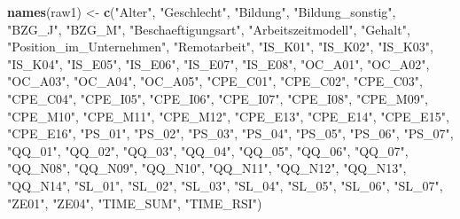 \documentclass[
]{article}
\newenvironment{Shaded}{\begin{snugshade}}{\end{snugshade}}
\newcommand{\FunctionTok}[1]{\textcolor[rgb]{0.13,0.29,0.53}{\textbf{#1}}}
\newcommand{\NormalTok}[1]{#1}
\newcommand{\OtherTok}[1]{\textcolor[rgb]{0.56,0.35,0.01}{#1}}
\newcommand{\StringTok}[1]{\textcolor[rgb]{0.31,0.60,0.02}{#1}}
\begin{document}
\begin{Shaded}
\begin{Highlighting}[]
\FunctionTok{names}\NormalTok{(raw1) }\OtherTok{\textless{}{-}} \FunctionTok{c}\NormalTok{(}\StringTok{"Alter"}\NormalTok{, }\StringTok{"Geschlecht"}\NormalTok{, }\StringTok{"Bildung"}\NormalTok{, }\StringTok{"Bildung\_sonstig"}\NormalTok{, }\StringTok{"BZG\_J"}\NormalTok{, }\StringTok{"BZG\_M"}\NormalTok{, }\StringTok{"Beschaeftigungsart"}\NormalTok{, }\StringTok{"Arbeitszeitmodell"}\NormalTok{, }\StringTok{"Gehalt"}\NormalTok{, }\StringTok{"Position\_im\_Unternehmen"}\NormalTok{, }\StringTok{"Remotarbeit"}\NormalTok{, }\StringTok{"IS\_K01"}\NormalTok{, }\StringTok{"IS\_K02"}\NormalTok{, }\StringTok{"IS\_K03"}\NormalTok{, }\StringTok{"IS\_K04"}\NormalTok{, }\StringTok{"IS\_E05"}\NormalTok{, }\StringTok{"IS\_E06"}\NormalTok{, }\StringTok{"IS\_E07"}\NormalTok{, }\StringTok{"IS\_E08"}\NormalTok{, }\StringTok{"OC\_A01"}\NormalTok{, }\StringTok{"OC\_A02"}\NormalTok{, }\StringTok{"OC\_A03"}\NormalTok{, }\StringTok{"OC\_A04"}\NormalTok{, }\StringTok{"OC\_A05"}\NormalTok{, }\StringTok{"CPE\_C01"}\NormalTok{, }\StringTok{"CPE\_C02"}\NormalTok{, }\StringTok{"CPE\_C03"}\NormalTok{, }\StringTok{"CPE\_C04"}\NormalTok{, }\StringTok{"CPE\_I05"}\NormalTok{, }\StringTok{"CPE\_I06"}\NormalTok{, }\StringTok{"CPE\_I07"}\NormalTok{, }\StringTok{"CPE\_I08"}\NormalTok{, }\StringTok{"CPE\_M09"}\NormalTok{, }\StringTok{"CPE\_M10"}\NormalTok{, }\StringTok{"CPE\_M11"}\NormalTok{, }\StringTok{"CPE\_M12"}\NormalTok{, }\StringTok{"CPE\_E13"}\NormalTok{, }\StringTok{"CPE\_E14"}\NormalTok{, }\StringTok{"CPE\_E15"}\NormalTok{, }\StringTok{"CPE\_E16"}\NormalTok{, }\StringTok{"PS\_01"}\NormalTok{, }\StringTok{"PS\_02"}\NormalTok{, }\StringTok{"PS\_03"}\NormalTok{, }\StringTok{"PS\_04"}\NormalTok{, }\StringTok{"PS\_05"}\NormalTok{, }\StringTok{"PS\_06"}\NormalTok{, }\StringTok{"PS\_07"}\NormalTok{, }\StringTok{"QQ\_01"}\NormalTok{, }\StringTok{"QQ\_02"}\NormalTok{, }\StringTok{"QQ\_03"}\NormalTok{, }\StringTok{"QQ\_04"}\NormalTok{, }\StringTok{"QQ\_05"}\NormalTok{, }\StringTok{"QQ\_06"}\NormalTok{, }\StringTok{"QQ\_07"}\NormalTok{, }\StringTok{"QQ\_N08"}\NormalTok{, }\StringTok{"QQ\_N09"}\NormalTok{, }\StringTok{"QQ\_N10"}\NormalTok{, }\StringTok{"QQ\_N11"}\NormalTok{, }\StringTok{"QQ\_N12"}\NormalTok{, }\StringTok{"QQ\_N13"}\NormalTok{, }\StringTok{"QQ\_N14"}\NormalTok{, }\StringTok{"SL\_01"}\NormalTok{, }\StringTok{"SL\_02"}\NormalTok{, }\StringTok{"SL\_03"}\NormalTok{, }\StringTok{"SL\_04"}\NormalTok{, }\StringTok{"SL\_05"}\NormalTok{, }\StringTok{"SL\_06"}\NormalTok{, }\StringTok{"SL\_07"}\NormalTok{, }\StringTok{"ZE01"}\NormalTok{, }\StringTok{"ZE04"}\NormalTok{, }\StringTok{"TIME\_SUM"}\NormalTok{, }\StringTok{"TIME\_RSI"}\NormalTok{)}
\end{Highlighting}
\end{Shaded}
\end{document}
